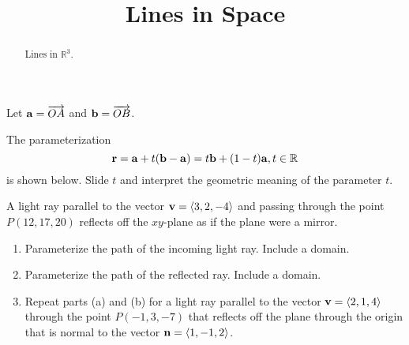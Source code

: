 \documentclass{ximera}
\title{Lines in Space}
\begin{document}
\begin{abstract}
Lines in $\mathbb{R}^3$.
\end{abstract}
\maketitle


\begin{exploration}   \label{Exsd67g:Line}
Let ${\bf a} = \overrightarrow{OA}$ and  ${\bf b} = \overrightarrow{OB}$.

The parameterization 
\[
    {\bf r} = {\bf a} + t({\bf b} - {\bf a}) = t{\bf b} + (1-t){\bf a} , t\in \mathbb{R}
\]
is shown below. Slide $t$ and interpret the geometric meaning of the parameter $t$.

 
\begin{onlineOnly}
    \begin{center}
\end{center}
\end{onlineOnly}

\end{exploration}


\begin{question}  \label{Qdr5577:Lines}
A light ray parallel to the vector ${\bf v} = \langle 3,2,-4 \rangle$ and passing through the point $P(12, 17,20)$ reflects off the $xy$-plane as if the plane were a mirror.

\begin{enumerate}

\item Parameterize the path of the incoming light ray. Include a domain.

\item Parameterize the path of the reflected ray. Include a domain.

\item Repeat parts (a) and (b) for a light ray parallel to the vector ${\bf v} = \langle 2,1,4 \rangle$ through the point $P(-1,3,-7)$ that reflects off the plane through the origin that is normal to the vector ${\bf n} = \langle  1, -1, 2 \rangle$.

\end{enumerate}

\end{question}
\end{document}
